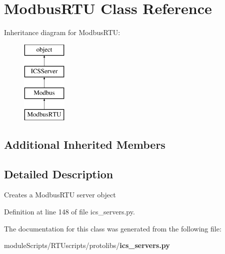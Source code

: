 \section{Modbus\+R\+T\+U Class Reference}
\label{classprotolibs_1_1ics__servers_1_1_modbus_r_t_u}
Inheritance diagram for Modbus\+R\+T\+U\+:\begin{figure}[H]
\begin{center}
\leavevmode
\includegraphics[height=4.000000cm]{classprotolibs_1_1ics__servers_1_1_modbus_r_t_u}
\end{center}
\end{figure}
\subsection*{Additional Inherited Members}


\subsection{Detailed Description}
\begin{DoxyVerb}Creates a ModbusRTU server object\end{DoxyVerb}
 

Definition at line 148 of file ics\+\_\+servers.\+py.



The documentation for this class was generated from the following file\+:\begin{DoxyCompactItemize}
\item 
module\+Scripts/\+R\+T\+Uscripts/protolibs/{\bf ics\+\_\+servers.\+py}\end{DoxyCompactItemize}

